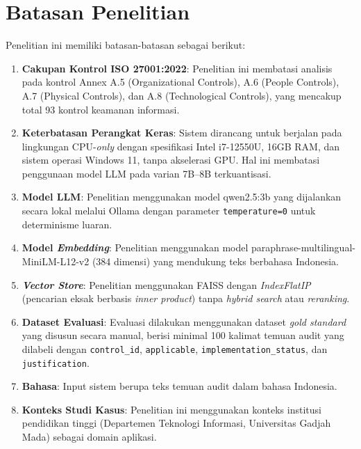 \documentclass[bachelor,bahasa]{thesisdtetiugm}
\begin{document}
\section{Batasan Penelitian}
\label{sec:batasan-penelitian}

Penelitian ini memiliki batasan-batasan sebagai berikut:

\begin{enumerate}
	\item \textbf{Cakupan Kontrol ISO 27001:2022}: Penelitian ini membatasi analisis pada kontrol Annex A.5 (Organizational Controls), A.6 (People Controls), A.7 (Physical Controls), dan A.8 (Technological Controls), yang mencakup total 93 kontrol keamanan informasi.
	
	\item \textbf{Keterbatasan Perangkat Keras}: Sistem dirancang untuk berjalan pada lingkungan CPU-\textit{only} dengan spesifikasi Intel i7-12550U, 16GB RAM, dan sistem operasi Windows 11, tanpa akselerasi GPU. Hal ini membatasi penggunaan model LLM pada varian 7B--8B terkuantisasi.
	
	\item \textbf{Model LLM}: Penelitian menggunakan model qwen2.5:3b yang dijalankan secara lokal melalui Ollama dengan parameter \texttt{temperature=0} untuk determinisme luaran.
	
	\item \textbf{Model \textit{Embedding}}: Penelitian menggunakan model paraphrase-multilingual-MiniLM-L12-v2 (384 dimensi) yang mendukung teks berbahasa Indonesia.
	
	\item \textbf{\textit{Vector Store}}: Penelitian menggunakan FAISS dengan \textit{IndexFlatIP} (pencarian eksak berbasis \textit{inner product}) tanpa \textit{hybrid search} atau \textit{reranking}.
	
	\item \textbf{Dataset Evaluasi}: Evaluasi dilakukan menggunakan dataset \textit{gold standard} yang disusun secara manual, berisi minimal 100 kalimat temuan audit yang dilabeli dengan \texttt{control\_id}, \texttt{applicable}, \texttt{implementation\_status}, dan \texttt{justification}.
	
	\item \textbf{Bahasa}: Input sistem berupa teks temuan audit dalam bahasa Indonesia.
	
	\item \textbf{Konteks Studi Kasus}: Penelitian ini menggunakan konteks institusi pendidikan tinggi (Departemen Teknologi Informasi, Universitas Gadjah Mada) sebagai domain aplikasi.
\end{enumerate}
\end{document}
